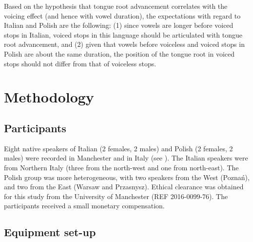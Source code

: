 \documentclass[authoryear, 5p]{elsarticle}
\begin{document}
Based on the hypothesis that tongue root advancement correlates with the
voicing effect (and hence with vowel duration), the expectations with
regard to Italian and Polish are the following: (1) since vowels are
longer before voiced stops in Italian, voiced stops in this language
should be articulated with tongue root advancement, and (2) given that
vowels before voiceless and voiced stops in Polish are about the same
duration, the position of the tongue root in voiced stops should not
differ from that of voiceless stops.

\section{Methodology}\label{methodology}

\subsection{Participants}\label{participants}


Eight native speakers of Italian (2 females, 2 males) and Polish (2
females, 2 males) were recorded in Manchester and in Italy (see
). The Italian speakers were from Northern Italy
(three from the north-west and one from north-east). The Polish group
was more heterogeneous, with two speakers from the West (Poznań), and
two from the East (Warsaw and Przasnysz). Ethical clearance was obtained
for this study from the University of Manchester (REF 2016-0099-76). The
participants received a small monetary compensation.

\subsection{Equipment set-up}\label{equipment-set-up}
\end{document}
